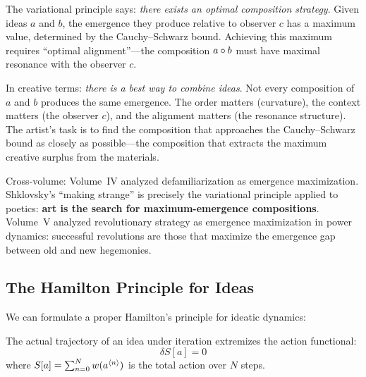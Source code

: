 \begin{interpretation}
The variational principle says: \emph{there exists an optimal composition
strategy}. Given ideas $a$ and $b$, the emergence they produce relative to
observer $c$ has a maximum value, determined by the Cauchy--Schwarz bound.
Achieving this maximum requires ``optimal alignment''---the composition $a
\circ b$ must have maximal resonance with the observer $c$.

In creative terms: \emph{there is a best way to combine ideas}. Not every
composition of $a$ and $b$ produces the same emergence. The order matters
(curvature), the context matters (the observer $c$), and the alignment matters
(the resonance structure). The artist's task is to find the composition that
approaches the Cauchy--Schwarz bound as closely as possible---the composition
that extracts the maximum creative surplus from the materials.

Cross-volume: Volume~IV analyzed defamiliarization as emergence maximization.
Shklovsky's ``making strange'' is precisely the variational principle applied
to poetics: \textbf{art is the search for maximum-emergence compositions}.
Volume~V analyzed revolutionary strategy as emergence maximization in power
dynamics: successful revolutions are those that maximize the emergence gap
between old and new hegemonies.
\end{interpretation}

\subsection{The Hamilton Principle for Ideas}

We can formulate a proper Hamilton's principle for ideatic dynamics:

\begin{theorem}
\label{thm:hamilton-principle-proper}
The actual trajectory of an idea under iteration extremizes the action
functional:
\[
  \delta S[a] = 0
\]
where $S[a] = \sum_{n=0}^N w(a^{\langle n \rangle})$ is the total action over $N$
steps.
\end{theorem}

